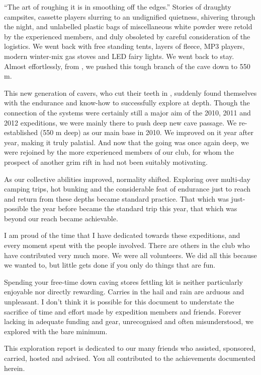 ``The art of roughing it is in smoothing off the edges.'' Stories of draughty campsites, cassette players slurring to an undignified quietness, shivering through the night, and unlabelled plastic bags of miscellaneous white powder were retold by the experienced members, and duly obsoleted by careful consideration of the logistics. We went back with free standing tents, layers of fleece, MP3 players, modern winter-mix gas stoves and LED fairy lights. We went back to stay. Almost effortlessly, from , we pushed this tough branch of the cave down to 550 m.

This new generation of cavers, who cut their teeth in ,
suddenly found themselves with the endurance and know-how to
successfully explore at depth. Though the connection of the systems were
certainly still a major aim of the 2010, 2011 and 2012 expeditions, we were
mainly there to push deep new cave passage. We re-established  (550 m deep) as our main base in 2010. We improved on it year after
year, making it truly palatial. And now that the going was once again
deep, we were rejoined by the more experienced members of our club, for
whom the prospect of another grim rift in  had not been
suitably motivating.

As our collective abilities improved, normality shifted. Exploring over
multi-day camping trips, hot bunking and the considerable feat of
endurance just to reach and return from these depths became standard
practice. That which was just-possible the year before became the
standard trip this year, that which was beyond our reach became achievable.

I am proud of the time that I have dedicated towards these expeditions,
and every moment spent with the people involved. There are others in the
club who have contributed very much more. We were all volunteers. We did
all this because we wanted to, but little gets done if you only do
things that are fun.

Spending your free-time down caving stores fettling kit is neither
particularly enjoyable nor directly rewarding. Carries in the hail and
rain are arduous and unpleasant. I don't think it is possible for this
document to understate the sacrifice of time and effort made by
expedition members and friends. Forever lacking in adequate funding and
gear, unrecognised and often misunderstood, we explored with the bare
minimum.

This exploration report is dedicated to our many friends who assisted,
sponsored, carried, hosted and advised. You all contributed to the
achievements documented herein.

